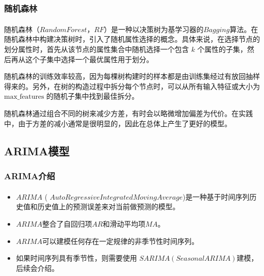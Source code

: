 \documentclass[withoutpreface,bwprint]{cumcmthesis}
\begin{document}

\subsubsection{随机森林}

随机森林\textsuperscript{\cite{belgiu2016random}}（\(Random Forest\)，\(RF\)）是一种以决策树为基学习器的\(Bagging\)算法。在随机森林中构建决策树时，引入了随机属性选择的概念。具体来说，在选择节点的划分属性时，首先从该节点的属性集合中随机选择一个包含 \( k \) 个属性的子集，然后再从这个子集中选择一个最优属性用于划分。

随机森林的训练效率较高，因为每棵树构建时的样本都是由训练集经过有放回抽样得来的。另外，在树的构造过程中拆分每个节点时，可以从所有输入特征或大小为 \( \text{max\_features} \) 的随机子集中找到最佳拆分。

随机森林通过组合不同的树来减少方差，有时会以略微增加偏差为代价。在实践中，由于方差的减小通常是很明显的，因此在总体上产生了更好的模型。



\subsection{ARIMA模型}

\subsubsection{ARIMA介绍}

\begin{itemize}[itemindent=2em]

\item \(ARIMA\) \textsuperscript{\cite{boschen1994long}}( \(Auto Regressive Integrated Moving Average\))是一种基于时间序列历史值和历史值上的预测误差来对当前做预测的模型。

\item \(ARIMA\)整合了自回归项\(AR\)和滑动平均项\(MA\)。

\item \(ARIMA\)可以建模任何存在一定规律的非季节性时间序列。

\item 如果时间序列具有季节性，则需要使用 \(SARIMA(Seasonal ARIMA)\)建模，后续会介绍。

\end{itemize}

\end{document}
